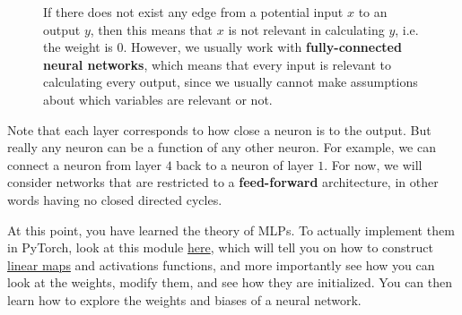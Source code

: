 \begin{definition}
\begin{figure}[H]
      \caption{If there does not exist any edge from a potential input $x$ to an output $y$, then this means that $x$ is not relevant in calculating $y$, i.e. the weight is $0$. However, we usually work with \textbf{fully-connected neural networks}, which means that every input is relevant to calculating every output, since we usually cannot make assumptions about which variables are relevant or not. }
      \label{fig:multilayer_neural_net}
    \end{figure}
  \end{definition}

  Note that each layer corresponds to how close a neuron is to the output. But really any neuron can be a function of any other neuron. For example, we can connect a neuron from layer $4$ back to a neuron of layer $1$. For now, we will consider networks that are restricted to a \textbf{feed-forward} architecture, in other words having no closed directed cycles. 

  \begin{code} 
    At this point, you have learned the theory of MLPs. To actually implement them in PyTorch, look at this module \href{code/parameters.ipynb}{here}, which will tell you on how to construct \hyperref[lin-def:linear_map]{linear maps} and activations functions, and more importantly see how you can look at the weights, modify them, and see how they are initialized. You can then learn how to explore the weights and biases of a neural network. 
  \end{code}

